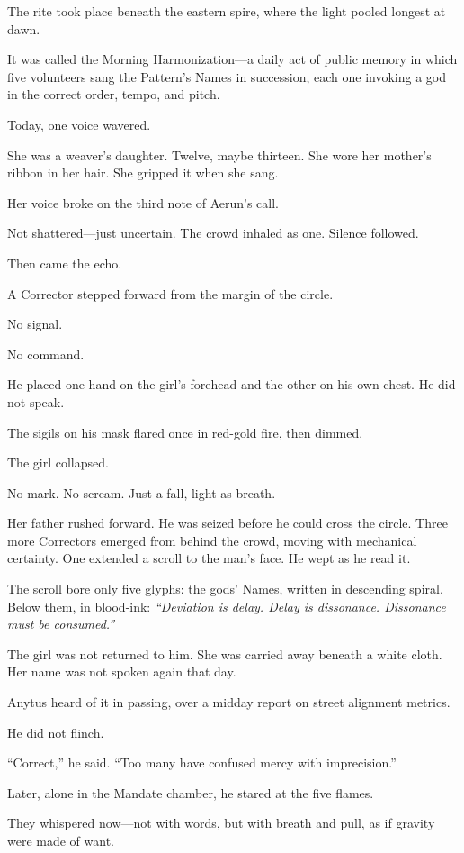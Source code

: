 \documentclass[9pt]{article}
\begin{document}
The rite took place beneath the eastern spire, where the light pooled longest at dawn. 

It was called the Morning Harmonization—a daily act of public memory in which five volunteers sang the Pattern’s Names in succession, each one invoking a god in the correct order, tempo, and pitch.

Today, one voice wavered.

She was a weaver’s daughter. Twelve, maybe thirteen. She wore her mother’s ribbon in her hair. She gripped it when she sang.

Her voice broke on the third note of Aerun’s call. 

Not shattered—just uncertain. The crowd inhaled as one. Silence followed.

Then came the echo.

A Corrector stepped forward from the margin of the circle. 

No signal. 

No command. 

He placed one hand on the girl’s forehead and the other on his own chest. He did not speak. 

The sigils on his mask flared once in red-gold fire, then dimmed.

The girl collapsed.

No mark. No scream. Just a fall, light as breath.

Her father rushed forward. He was seized before he could cross the circle. Three more Correctors emerged from behind the crowd, moving with mechanical certainty. One extended a scroll to the man’s face. He wept as he read it.

The scroll bore only five glyphs: the gods’ Names, written in descending spiral. Below them, in blood-ink: \textit{“Deviation is delay. Delay is dissonance. Dissonance must be consumed.”}

The girl was not returned to him. She was carried away beneath a white cloth. Her name was not spoken again that day.

Anytus heard of it in passing, over a midday report on street alignment metrics. 

He did not flinch. 

“Correct,” he said. “Too many have confused mercy with imprecision.”

Later, alone in the Mandate chamber, he stared at the five flames.

They whispered now—not with words, but with breath and pull, as if gravity were made of want.
\end{document}
